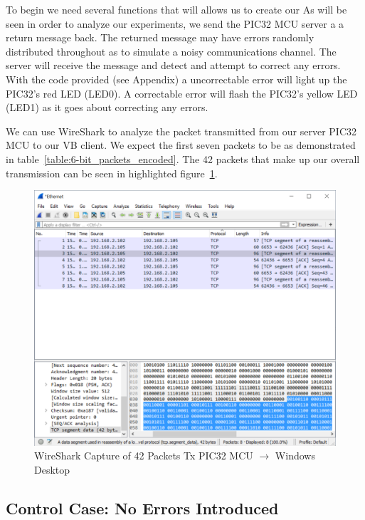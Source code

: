 \documentclass[12pt]{article}
\begin{document}
To begin we need several functions that will allows us to create our 
As will be seen in order to analyze our experiments, we send
the PIC32 MCU server a a return message back. The returned message may
have errors randomly distributed throughout as to simulate a noisy 
communications channel. The server will receive the message and detect 
and attempt to correct any errors. With the code provided 
(see Appendix) a uncorrectable error will light up
the PIC32's red LED (LED0). A correctable error will flash the PIC32's
yellow LED (LED1) as it goes about correcting any errors. 

We can use WireShark to analyze the packet transmitted from our server 
PIC32 MCU to our VB client. We expect the first seven packets to be as 
demonstrated in table~\ref{table:6-bit_packets_encoded}. The 42 packets
that make up our overall transmission can be seen in highlighted
figure~\ref{fig:piccontrol}. 

\begin{figure}[H]
    \centering
    \includegraphics[width=5.5in]{images/wireshark_source_tx.PNG}
    \caption{WireShark Capture of 42 Packets Tx 
        PIC32 MCU $\rightarrow$ Windows Desktop}
    \label{fig:piccontrol}
\end{figure}

\subsection{Control Case: No Errors Introduced}
\label{sec:control}
\end{document}
